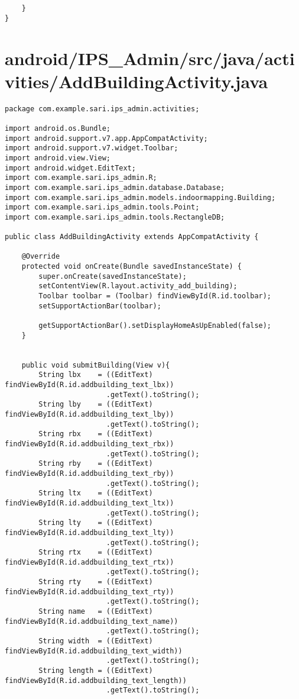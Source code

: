 \begin{lstlisting}
    }
}
\end{lstlisting}
\newpage
\section{android/IPS\_Admin/src/java/activities/AddBuildingActivity.java}
\begin{lstlisting}package com.example.sari.ips_admin.activities;

import android.os.Bundle;
import android.support.v7.app.AppCompatActivity;
import android.support.v7.widget.Toolbar;
import android.view.View;
import android.widget.EditText;
import com.example.sari.ips_admin.R;
import com.example.sari.ips_admin.database.Database;
import com.example.sari.ips_admin.models.indoormapping.Building;
import com.example.sari.ips_admin.tools.Point;
import com.example.sari.ips_admin.tools.RectangleDB;

public class AddBuildingActivity extends AppCompatActivity {

    @Override
    protected void onCreate(Bundle savedInstanceState) {
        super.onCreate(savedInstanceState);
        setContentView(R.layout.activity_add_building);
        Toolbar toolbar = (Toolbar) findViewById(R.id.toolbar);
        setSupportActionBar(toolbar);

        getSupportActionBar().setDisplayHomeAsUpEnabled(false);
    }


    public void submitBuilding(View v){
        String lbx    = ((EditText) findViewById(R.id.addbuilding_text_lbx))
                        .getText().toString();
        String lby    = ((EditText) findViewById(R.id.addbuilding_text_lby))
                        .getText().toString();
        String rbx    = ((EditText) findViewById(R.id.addbuilding_text_rbx))
                        .getText().toString();
        String rby    = ((EditText) findViewById(R.id.addbuilding_text_rby))
                        .getText().toString();
        String ltx    = ((EditText) findViewById(R.id.addbuilding_text_ltx))
                        .getText().toString();
        String lty    = ((EditText) findViewById(R.id.addbuilding_text_lty))
                        .getText().toString();
        String rtx    = ((EditText) findViewById(R.id.addbuilding_text_rtx))
                        .getText().toString();
        String rty    = ((EditText) findViewById(R.id.addbuilding_text_rty))
                        .getText().toString();
        String name   = ((EditText) findViewById(R.id.addbuilding_text_name))
                        .getText().toString();
        String width  = ((EditText) findViewById(R.id.addbuilding_text_width))
                        .getText().toString();
        String length = ((EditText) findViewById(R.id.addbuilding_text_length))
                        .getText().toString();


\end{lstlisting}
